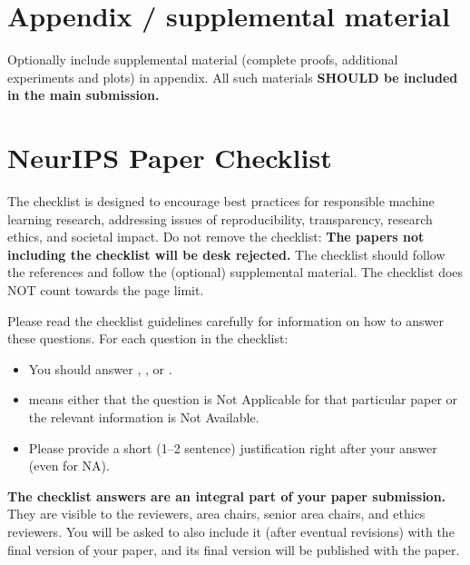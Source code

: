   
  
  \appendix
  
  \section{Appendix / supplemental material}
  
  
  Optionally include supplemental material (complete proofs, additional experiments and plots) in appendix.
  All such materials \textbf{SHOULD be included in the main submission.}
  
  
  \newpage
  \section*{NeurIPS Paper Checklist}
  
  The checklist is designed to encourage best practices for responsible machine learning research, addressing issues of reproducibility, transparency, research ethics, and societal impact. Do not remove the checklist: {\bf The papers not including the checklist will be desk rejected.} The checklist should follow the references and follow the (optional) supplemental material.  The checklist does NOT count towards the page
  limit. 
  
  Please read the checklist guidelines carefully for information on how to answer these questions. For each question in the checklist:
  \begin{itemize}
      \item You should answer \answerYes{}, \answerNo{}, or \answerNA{}.
      \item \answerNA{} means either that the question is Not Applicable for that particular paper or the relevant information is Not Available.
      \item Please provide a short (1–2 sentence) justification right after your answer (even for NA). 
  \end{itemize}
  
  {\bf The checklist answers are an integral part of your paper submission.} They are visible to the reviewers, area chairs, senior area chairs, and ethics reviewers. You will be asked to also include it (after eventual revisions) with the final version of your paper, and its final version will be published with the paper.
  
